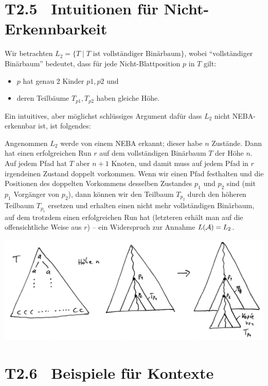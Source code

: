 \documentclass[fontsize=11pt, twoside=false, numbers=autoenddot]{scrbook}
\begin{document}
\section*{T2.5~ Intuitionen für Nicht-Erkennbarkeit}

Wir betrachten $L_2 = \{T \mid \text{$T$ ist vollständiger Binärbaum}\}$,
wobei "`vollständiger Binärbaum"' bedeutet, dass für jede Nicht-Blattposition $p$ in $T$ gilt:
%
\begin{itemize}
  \item
    $p$ hat genau 2 Kinder $p1,p2$ \quad und
  \item
    deren Teilbäume $T_{p1},T_{p2}$ haben gleiche Höhe.
\end{itemize}
%
Ein intuitives, aber möglichst schlüssiges Argument dafür
dass $L_2$ nicht NEBA-erkennbar ist, ist folgendes:

Angenommen $L_2$ werde von einem NEBA \Amc erkannt; dieser habe $n$ Zustände.
Dann hat \Amc einen erfolgreichen Run $r$ auf dem vollständigen Binärbaum $T$
der Höhe $n$. Auf jedem Pfad hat $T$ aber $n+1$ Knoten,
und damit muss auf jedem Pfad in $r$ irgendeinen Zustand doppelt vorkommen.
Wenn wir einen Pfad festhalten
und die Positionen des doppelten Vorkommens desselben Zustandes $p_1$ und $p_2$ sind
(mit $p_1$ Vorgänger von $p_2$),
dann können wir den Teilbaum $T_{p_2}$ durch den höheren Teilbaum $T_{p_1}$ ersetzen
und erhalten einen nicht mehr vollständigen Binärbaum,
auf dem \Amc trotzdem einen erfolgreichen Run hat
(letzteren erhält man auf die offensichtliche Weise aus $r$)
-- ein Widerspruch zur Annahme $L(\mathcal{A}) = L_2$.
%
\begin{center}
  \includegraphics[width=.95\linewidth]{img/t2_5.pdf}
\end{center}

\section*{T2.6~ Beispiele für Kontexte}
\end{document}
